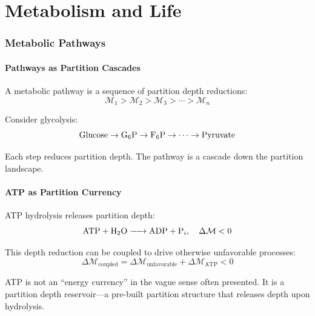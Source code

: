 ﻿\documentclass[twocolumn,10pt,a4paper]{article}
\theoremstyle{definition}
\theoremstyle{remark}
\newcommand{\Depth}{\mathcal{M}}
\begin{document}
\part{Metabolism and Life}

\section{Metabolic Pathways}
\label{sec:metabolism}

\subsection{Pathways as Partition Cascades}

A metabolic pathway is a sequence of partition depth reductions:
\begin{equation}
    \Depth_1 > \Depth_2 > \Depth_3 > \cdots > \Depth_n
\end{equation}

Consider glycolysis:
\begin{equation}
    \ce{Glucose} \to \ce{G6P} \to \ce{F6P} \to \cdots \to \ce{Pyruvate}
\end{equation}

Each step reduces partition depth. The pathway is a cascade down the partition landscape.

\subsection{ATP as Partition Currency}

ATP hydrolysis releases partition depth:
\begin{equation}
    \ce{ATP + H2O -> ADP + P_i}, \quad \Delta\Depth < 0
\end{equation}

This depth reduction can be coupled to drive otherwise unfavorable processes:
\begin{equation}
    \Delta\Depth_{\mathrm{coupled}} = \Delta\Depth_{\mathrm{unfavorable}} + \Delta\Depth_{\mathrm{ATP}} < 0
\end{equation}

ATP is not an ``energy currency'' in the vague sense often presented. It is a partition depth reservoir---a pre-built partition structure that releases depth upon hydrolysis.
\end{document}
